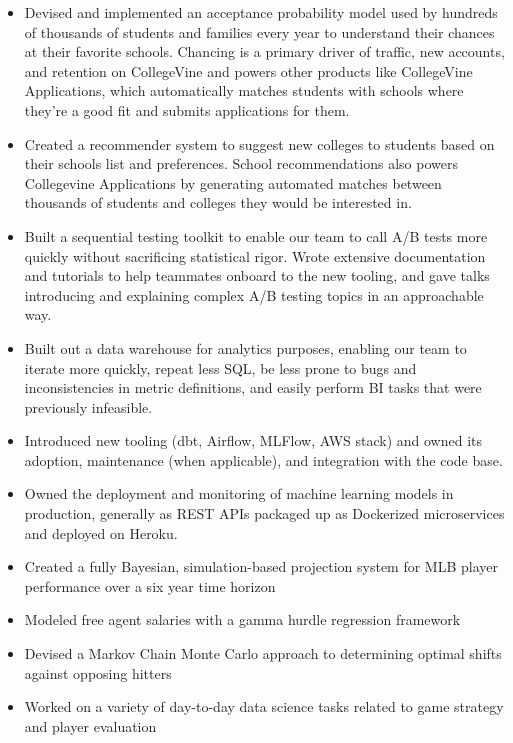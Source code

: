 \documentclass[10pt,a4paper,ragged2e,withhyper]{/Users/matt/documents/GitHub/mrkaye97.github.io/resume/altacv}
\begin{document}
	


	 \makecvheader
		
	
		\begin{itemize}
		\item Devised and implemented an acceptance probability model used by hundreds of thousands of students and families every year to understand their chances at their favorite schools.  Chancing is a primary driver of traffic, new accounts, and retention on CollegeVine and powers other products like CollegeVine Applications, which automatically matches students with schools where they're a good fit and submits applications for them.
		\item Created a recommender system to suggest new colleges to students based on their schools list and preferences. School recommendations also powers Collegevine Applications by generating automated matches between thousands of students and colleges they would be interested in.
		\item Built a sequential testing toolkit to enable our team to call A/B tests more quickly without sacrificing statistical rigor. Wrote extensive documentation and tutorials to help teammates onboard to the new tooling, and gave talks introducing and explaining complex A/B testing topics in an approachable way.
		\item Built out a data warehouse for analytics purposes, enabling our team to iterate more quickly, repeat less SQL,  be less prone to bugs and inconsistencies in metric definitions, and easily perform BI tasks that were previously infeasible.
		\item Introduced new tooling (dbt, Airflow, MLFlow, AWS stack) and owned its adoption, maintenance (when applicable), and integration with the code base. 
		\item Owned the deployment and monitoring of machine learning models in production, generally as REST APIs packaged up as Dockerized microservices and deployed on Heroku.
		\end{itemize}
		
		\divider
		

		\begin{itemize}
		\item Created a fully Bayesian, simulation-based projection system for MLB player performance over a six year time horizon
		\item Modeled free agent salaries with a gamma hurdle regression framework
		\item Devised a Markov Chain Monte Carlo approach to determining optimal shifts against opposing hitters
		\item Worked on a variety of day-to-day data science tasks related to game strategy and player evaluation
		\end{itemize}
		
\end{document}
